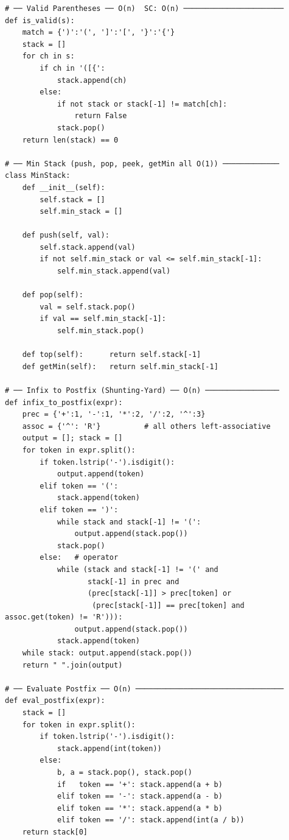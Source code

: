\documentclass[11pt,a4paper]{report}
\begin{document}
\begin{lstlisting}
# ── Valid Parentheses ── O(n)  SC: O(n) ───────────────────────
def is_valid(s):
    match = {')':'(', ']':'[', '}':'{'}
    stack = []
    for ch in s:
        if ch in '([{':
            stack.append(ch)
        else:
            if not stack or stack[-1] != match[ch]:
                return False
            stack.pop()
    return len(stack) == 0

# ── Min Stack (push, pop, peek, getMin all O(1)) ─────────────
class MinStack:
    def __init__(self):
        self.stack = []
        self.min_stack = []

    def push(self, val):
        self.stack.append(val)
        if not self.min_stack or val <= self.min_stack[-1]:
            self.min_stack.append(val)

    def pop(self):
        val = self.stack.pop()
        if val == self.min_stack[-1]:
            self.min_stack.pop()

    def top(self):      return self.stack[-1]
    def getMin(self):   return self.min_stack[-1]

# ── Infix to Postfix (Shunting-Yard) ── O(n) ─────────────────
def infix_to_postfix(expr):
    prec = {'+':1, '-':1, '*':2, '/':2, '^':3}
    assoc = {'^': 'R'}          # all others left-associative
    output = []; stack = []
    for token in expr.split():
        if token.lstrip('-').isdigit():
            output.append(token)
        elif token == '(':
            stack.append(token)
        elif token == ')':
            while stack and stack[-1] != '(':
                output.append(stack.pop())
            stack.pop()
        else:   # operator
            while (stack and stack[-1] != '(' and
                   stack[-1] in prec and
                   (prec[stack[-1]] > prec[token] or
                    (prec[stack[-1]] == prec[token] and assoc.get(token) != 'R'))):
                output.append(stack.pop())
            stack.append(token)
    while stack: output.append(stack.pop())
    return " ".join(output)

# ── Evaluate Postfix ── O(n) ──────────────────────────────────
def eval_postfix(expr):
    stack = []
    for token in expr.split():
        if token.lstrip('-').isdigit():
            stack.append(int(token))
        else:
            b, a = stack.pop(), stack.pop()
            if   token == '+': stack.append(a + b)
            elif token == '-': stack.append(a - b)
            elif token == '*': stack.append(a * b)
            elif token == '/': stack.append(int(a / b))
    return stack[0]
\end{lstlisting}
\end{document}
